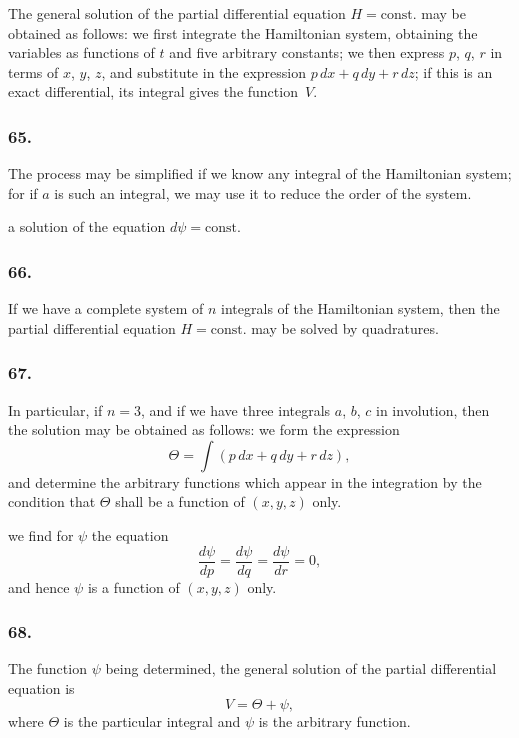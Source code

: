 \documentclass[11pt,a4paper]{book}
\begin{document}
The general solution of the partial differential equation $H = \text{const.}$ may be obtained as follows: we first integrate the Hamiltonian system, obtaining the variables as functions of $t$ and five arbitrary constants; we then express $p$, $q$, $r$ in terms of $x$, $y$, $z$, and substitute in the expression $p\,dx + q\,dy + r\,dz$; if this is an exact differential, its integral gives the function~$V$.

\subsubsection*{65.}

The process may be simplified if we know any integral of the Hamiltonian system; for if $a$ is such an integral, we may use it to reduce the order of the system.

\newpage
\setcounter{page}{142}

a solution of the equation $d\psi = \text{const.}$

\subsubsection*{66.}

If we have a complete system of $n$ integrals of the Hamiltonian system, then the partial differential equation $H = \text{const.}$ may be solved by quadratures.

\subsubsection*{67.}

In particular, if $n = 3$, and if we have three integrals $a$, $b$, $c$ in involution, then the solution may be obtained as follows: we form the expression
\[
\Theta = \int(p\,dx + q\,dy + r\,dz),
\]
and determine the arbitrary functions which appear in the integration by the condition that $\Theta$ shall be a function of $(x, y, z)$ only.

\newpage
\setcounter{page}{143}

we find for $\psi$ the equation
\[
\frac{d\psi}{dp} = \frac{d\psi}{dq} = \frac{d\psi}{dr} = 0,
\]
and hence $\psi$ is a function of $(x, y, z)$ only.

\subsubsection*{68.}

The function $\psi$ being determined, the general solution of the partial differential equation is
\[
V = \Theta + \psi,
\]
where $\Theta$ is the particular integral and $\psi$ is the arbitrary function.
\end{document}
